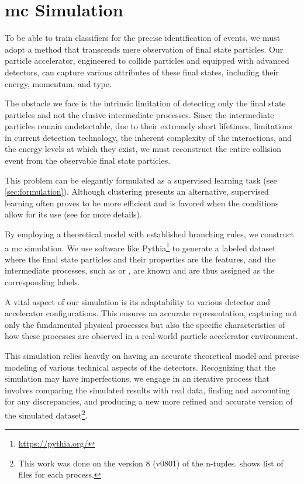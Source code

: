 
\section[Monte Carlo Simulation]{\gls{mc} Simulation}
\label{sec:mc}

To be able to train classifiers for the precise identification of \tth events, we must adopt a method that transcends
mere observation of final state particles. Our particle accelerator, engineered to collide particles and equipped with
advanced detectors, can capture various attributes of these final states, including their energy, momentum, and type.

The obstacle we face is the intrinsic limitation of detecting only the final state particles and not the elusive
intermediate processes. Since the intermediate particles remain undetectable, due to their extremely short lifetimes,
limitations in current detection technology, the inherent complexity of the interactions, and the energy levels at which
they exist, we must reconstruct the entire collision event from the observable final state particles.

This problem can be elegantly formulated as a supervised learning task (see \autoref{sec:formulation}). Although
clustering presents an alternative, supervised learning often proves to be more efficient and is favored when the
conditions allow for its use (see  for more details).

By employing a theoretical model with established branching rules, we construct a \gls{mc} simulation.  We use software
like Pythia\footnote{\url{https://pythia.org/}} to generate a labeled dataset where the
final state particles and their properties are the features, and the intermediate processes, such as \tth or \ttw, are
known and are thus assigned as the corresponding labels.

A vital aspect of our simulation is its adaptability to various detector and accelerator configurations. This ensures an
accurate representation, capturing not only the fundamental physical processes but also the specific characteristics of
how these processes are observed in a real-world particle accelerator environment.

This simulation relies heavily on having an accurate theoretical model and precise modeling of various technical aspects
of the detectors. Recognizing that the simulation may have imperfections, we engage in an iterative process that
involves comparing the simulated results with real data, finding and accounting for any discrepancies, and producing a
new more refined and accurate version of the simulated dataset\footnote{This work was done on the version 8 (v0801) of
    the n-tuples.  shows list of files for each process.}.

